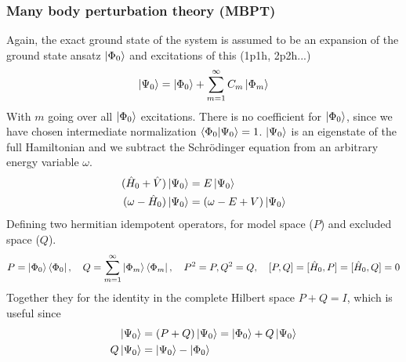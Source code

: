 \documentclass[
11pt,notheorems,hyperref={pdfauthor=whatever}
]{beamer}
\begin{document}
\begin{frame}
    \frametitle{Many body perturbation theory (MBPT)}
    Again, the exact ground state of the system is assumed to be an expansion of the ground state ansatz $\ket{\Phi_0}$ and excitations of this (1p1h, 2p2h...)
    \begin{align*}
        \ket{\Psi_0} = \ket{\Phi_0} + \sum_{m=1}^{\infty}C_m \ket{\Phi_m}
    \end{align*}
    With $m$ going over all $\ket{\Phi_0}$ excitations. There is no coefficient for $\ket{\Phi_0}$, since we have chosen intermediate normalization $\braket{\Phi_0 | \Psi_0} = 1$. $\ket{\Psi_0}$ is an eigenstate of the full Hamiltonian and we subtract the Schr\"{o}dinger equation from an arbitrary energy variable $\omega$. 
    \begin{align*}
        (\hat{H}_0 + \hat{V})\ket{\Psi_0} &= E \ket{\Psi_0} \\
        (\omega - \hat{H}_0)\ket{\Psi_0} &= (\omega-E+V)\ket{\Psi_0}
    \end{align*} 
    Defining two hermitian idempotent operators, for model space ($P$) and excluded space ($Q$).
    \begin{align*}
        P = \ket{\Phi_0}\bra{\Phi_0}, \hspace{10px} Q = \sum_{m=1}^\infty \ket{\Phi_m}\bra{\Phi_m},\hspace{10px} P^2 = P, Q^2 = Q,\hspace{10px} [P,Q] = [\hat{H}_0, P] = [\hat{H}_0, Q] = 0
    \end{align*}
    Together they for the identity in the complete Hilbert space $P + Q = I$, which is useful since
    \begin{align*}
        \ket{\Psi_0} &= (P+Q)\ket{\Psi_0} = \ket{\Phi_0} + Q\ket{\Psi_0} \\
        Q\ket{\Psi_0} &= \ket{\Psi_0} - \ket{\Phi_0} 
    \end{align*}  
\end{frame}
\end{document}
